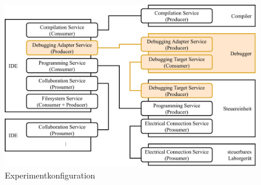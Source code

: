 \begin{figure}[htbp]
    \centering
    \includegraphics[width=\textwidth]{diagrams/experimentkonfigurationen/Experimentkonfiguration-04.drawio.pdf}
    \caption{Experimentkonfiguration}
    \label{figure:experimentkonfiguration:debugging}
\end{figure}